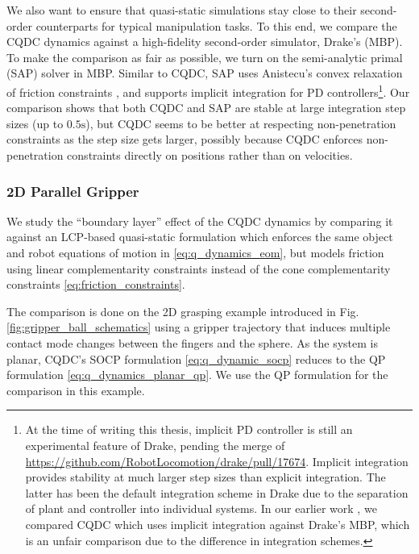 We also want to ensure that quasi-static simulations stay close to their second-order counterparts for typical manipulation tasks. To this end, we compare the CQDC dynamics against a high-fidelity second-order simulator, Drake's  (MBP). To make the comparison as fair as possible, we turn on the semi-analytic primal (SAP) solver \cite{castro2021unconstrained} in MBP. Similar to CQDC, SAP uses Anistecu's convex relaxation of friction constraints \cite{anitescu2006optimization}, and supports implicit integration for PD controllers\footnote{
At the time of writing this thesis, implicit PD controller is still an experimental feature of Drake, pending the merge of \url{https://github.com/RobotLocomotion/drake/pull/17674}.
Implicit integration provides stability at much larger step sizes than explicit integration. The latter has been the default integration scheme in Drake due to the separation of plant and controller into individual systems. In our earlier work \cite{pang2021convex}, we compared CQDC which uses implicit integration against Drake's MBP, which is an unfair comparison due to the difference in integration schemes. 
}.
Our comparison shows that both CQDC and SAP are stable at large integration step sizes (up to $0.5\mathrm{s}$), but CQDC seems to be better at respecting non-penetration constraints as the step size gets larger, possibly because CQDC enforces non-penetration constraints directly on positions rather than on velocities.


\subsubsection{2D Parallel Gripper}
We study the ``boundary layer'' effect of the CQDC dynamics by comparing it against an LCP-based quasi-static formulation \cite{pang2021convex} which enforces the same object and robot equations of motion in \eqref{eq:q_dynamics_eom}, but models friction using linear complementarity constraints \cite{stewart1996implicit} instead of the cone complementarity constraints \eqref{eq:friction_constraints}. 

The comparison is done on the 2D grasping example introduced in Fig. \ref{fig:gripper_ball_schematics} using a gripper trajectory that induces multiple contact mode changes between the fingers and the sphere. As the system is planar, CQDC's SOCP formulation \eqref{eq:q_dynamic_socp} reduces to the QP formulation \eqref{eq:q_dynamics_planar_qp}. We use the QP formulation for the comparison in this example. 

